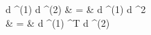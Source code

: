 d ^{(1)} \cdot d ^{(2)} & = &  d ^{(1)} \cdot {} d ^2 \\
&                                   = & d ^{(1)} \cdot {}^T  d ^{(2)}
